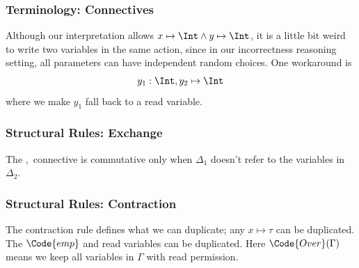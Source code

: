 \begin{frame}
    \frametitle{Terminology: Connectives}

Although our interpretation allows $x \mapsto \Int \land y \mapsto \Int$, it is a little bit weird to write two variables in the same action, since in our incorrectness reasoning setting, all parameters can have independent random choices. One workaround is 
\begin{align*}
    y_1: \Int, y_2 \mapsto \Int
\end{align*}
where we make $y_1$ fall back to a read variable.

\end{frame}


\begin{frame}
    \frametitle{Structural Rules: Exchange}   

\begin{figure}[!ht]
\quad
{}
\end{figure}

The $,$ connective is commutative only when $\Delta_1$ doesn't refer to the variables in $\Delta_2$.
    
\end{frame}

\begin{frame}
    \frametitle{Structural Rules: Contraction}   

\begin{figure}[!ht]
\quad
{}
\quad
{}
\end{figure}

The contraction rule defines what we can duplicate; any $x \mapsto \tau$ can be duplicated. The $\Code{emp}$ and read variables can be duplicated. 
Here $\Code{Over}(\Gamma)$ means we keep all variables in $\Gamma$ with read permission.
\end{frame}

